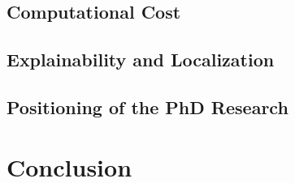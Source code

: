 \documentclass[11pt,a4paper]{article}
\begin{document}
    \subsection{Computational Cost}
    \label{subsec:computational-cost}

    \subsection{Explainability and Localization}
    \label{subsec:explainability-localization}

    \subsection{Positioning of the PhD Research}
    \label{subsec:phd-positioning}

    \section{Conclusion}
    \label{sec:conclusion}

    
    
\end{document}
